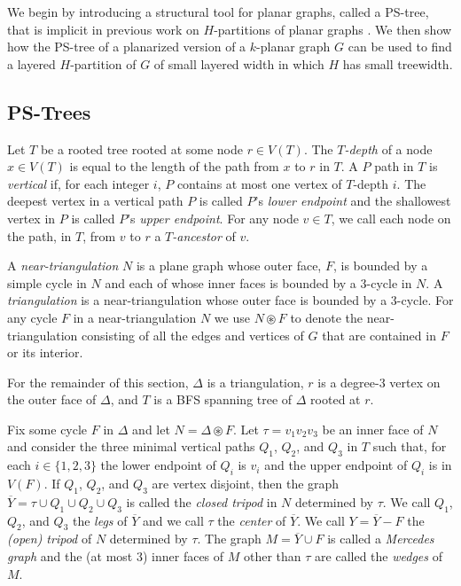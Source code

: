 \documentclass{patmorin}
\begin{document}
We begin by introducing a structural tool for planar graphs, called a PS-tree, that is implicit in previous work on $H$-partitions of planar graphs \cite{dujmovic.joret.ea:planar}.  We then show how the PS-tree of a planarized version of a $k$-planar graph $G$ can be used to find a layered $H$-partition of $G$ of small layered width in which $H$ has small treewidth. 

\subsection{PS-Trees}

Let $T$ be a rooted tree rooted at some node $r\in V(T)$. The \emph{$T$-depth} of a node $x\in V(T)$ is equal to the length of the path from $x$ to $r$ in $T$. A $P$ path in $T$ is \emph{vertical} if, for each integer $i$, $P$ contains at most one vertex of $T$-depth $i$.  The deepest vertex in a vertical path $P$ is called  $P$'s \emph{lower endpoint} and the shallowest vertex in $P$ is called $P$'s \emph{upper endpoint}. For any node $v\in T$, we call each node on the path, in $T$, from $v$ to $r$ a \emph{$T$-ancestor} of $v$.

A \emph{near-triangulation} $N$ is a plane graph whose outer face, $F$, is bounded by a simple cycle in $N$ and each of whose inner faces is bounded by a 3-cycle in $N$.  A \emph{triangulation} is a near-triangulation whose outer face is bounded by a 3-cycle.  For any cycle $F$ in a near-triangulation $N$ we use $N\circledast F$ to denote the near-triangulation consisting of all the edges and vertices of $G$ that are contained in $F$ or its interior.

For the remainder of this section, $\Delta$ is a triangulation, $r$ is a degree-3 vertex on the outer face of $\Delta$, and $T$ is a BFS spanning tree of $\Delta$ rooted at $r$.

Fix some cycle $F$ in $\Delta$ and let $N=\Delta\circledast F$.
Let $\tau=v_1v_2v_3$ be an inner face of $N$ and consider the three minimal vertical paths $Q_1$, $Q_2$, and $Q_3$ in $T$ such that, for each $i\in\{1,2,3\}$ the lower endpoint of $Q_i$ is $v_i$ and the upper endpoint of $Q_i$ is in $V(F)$.  If $Q_1$, $Q_2$, and $Q_3$ are vertex disjoint, then the graph $\overline{Y}=\tau\cup Q_1\cup Q_2\cup Q_3$ is called the \emph{closed tripod} in $N$ determined by $\tau$.  We call $Q_1$, $Q_2$, and $Q_3$ the \emph{legs} of $\overline{Y}$ and we call $\tau$ the \emph{center} of $\overline{Y}$.  We call $Y=\overline{Y}-F$ the \emph{(open) tripod} of $N$ determined by $\tau$.  The graph $M=\overline{Y}\cup F$ is called a \emph{Mercedes graph} and the (at most 3) inner faces of $M$ other than $\tau$ are called the \emph{wedges} of $M$.
\end{document}
